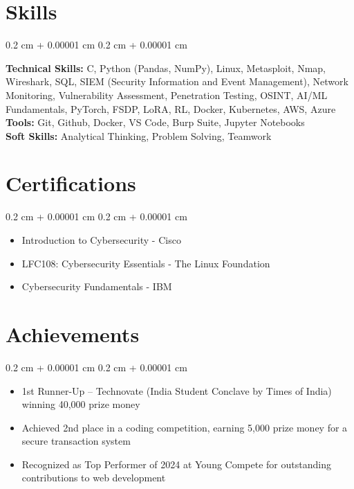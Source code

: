 \documentclass[10pt, letterpaper]{article}
\newenvironment{highlights}{
    \begin{itemize}[
        topsep=0.10 cm,
        parsep=0.10 cm,
        partopsep=0pt,
        itemsep=0pt,
        leftmargin=0.4 cm + 10pt
    ]
}{
    \end{itemize}
} %
\newenvironment{onecolentry}{
    \begin{adjustwidth}{
        0.2 cm + 0.00001 cm
    }{
        0.2 cm + 0.00001 cm
    }
}{
    \end{adjustwidth}
} %
\let\hrefWithoutArrow\href
\renewcommand{\href}[2]{\hrefWithoutArrow{#1}{\ifthenelse{\equal{#2}{}}{ }{#2 }\raisebox{.15ex}{\footnotesize \faExternalLink*}}}
\begin{document}
    \section{Skills}
    \begin{onecolentry}
        \textbf{Technical Skills:} C, Python (Pandas, NumPy), Linux, Metasploit, Nmap, Wireshark, SQL, SIEM (Security Information and Event Management), Network Monitoring, Vulnerability Assessment, Penetration Testing, OSINT, AI/ML Fundamentals, PyTorch, FSDP, LoRA, RL, Docker, Kubernetes, AWS, Azure \\
        \textbf{Tools:} Git, Github, Docker, VS Code, Burp Suite, Jupyter Notebooks \\
        \textbf{Soft Skills:} Analytical Thinking, Problem Solving, Teamwork
    \end{onecolentry}
    \section{Certifications}
    \begin{onecolentry}
        \begin{highlights}
            \item Introduction to Cybersecurity - Cisco \href{https://www.credly.com/badges/a7c00b29-a55e-42e6-8fa6-90174db3e9d7/public_url}{\textcolor{primaryColor}{\small [View Certificate]}}
            \item LFC108: Cybersecurity Essentials - The Linux Foundation \href{https://www.credly.com/badges/50d5dd68-4744-4b04-b719-3f0658e97910/public_url}{\textcolor{primaryColor}{\small [View Certificate]}}
            \item Cybersecurity Fundamentals - IBM \href{https://www.credly.com/badges/0e03da41-f13a-4a06-9835-caf8a48ac10d/public_url}{\textcolor{primaryColor}{\small [View Certificate]}}
        \end{highlights}
    \end{onecolentry}
    \section{Achievements}
    \begin{onecolentry}
        \begin{highlights}
            \item 1st Runner-Up – Technovate (India Student Conclave by Times of India) winning 40,000 prize money
            \item Achieved 2nd place in a coding competition, earning 5,000 prize money for a secure transaction system
            \item Recognized as Top Performer of 2024 at Young Compete for outstanding contributions to web development
        \end{highlights}
    \end{onecolentry}
\end{document}
